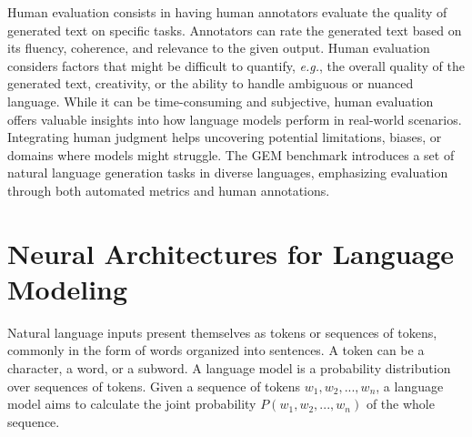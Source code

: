 Human evaluation consists in having human annotators evaluate the quality of generated text on specific tasks. Annotators can rate the generated text based on its fluency, coherence, and relevance to the given output. Human evaluation considers factors that might be difficult to quantify, \textit{e.g.}, the overall quality of the generated text, creativity, or the ability to handle ambiguous or nuanced language. While it can be time-consuming and subjective, human evaluation offers valuable insights into how language models perform in real-world scenarios. Integrating human judgment helps uncovering potential limitations, biases, or domains where models might struggle. The \ac{GEM} benchmark \citep{gehrmann2021gem} introduces a set of natural language generation tasks in diverse languages, emphasizing evaluation through both automated metrics and human annotations. 



\section{Neural Architectures for Language Modeling}



Natural language inputs present themselves as tokens or sequences of tokens, commonly in the form of words organized into sentences. A token can be a character, a word, or a subword. A language model is a probability distribution over sequences of tokens. Given a sequence of tokens $w_1, w_2, ..., w_n$, a language model aims to calculate the joint probability $P(w_1, w_2, ..., w_n)$ of the whole sequence. 


